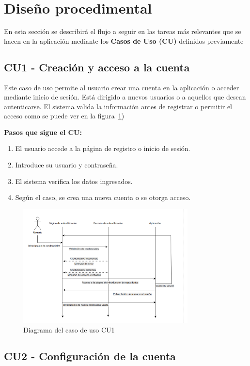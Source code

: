 \section{Diseño procedimental}
En esta sección se describirá el flujo a seguir en las tareas más relevantes que se hacen en la aplicación mediante los \textbf{Casos de Uso (CU)} definidos previamente

\subsection*{CU1 - Creación y acceso a la cuenta}

Este caso de uso permite al usuario crear una cuenta en la aplicación o acceder mediante inicio de sesión. Está dirigido a nuevos usuarios o a aquellos que desean autenticarse. El sistema valida la información antes de registrar o permitir el acceso como se puede ver en la figura~\ref{fig:DiagramaCU1})

\textbf{Pasos que sigue el CU:}
\begin{enumerate}
  \item El usuario accede a la página de registro o inicio de sesión.
  \item Introduce su usuario y contraseña.
  \item El sistema verifica los datos ingresados.
  \item Según el caso, se crea una nueva cuenta o se otorga acceso.
\end{enumerate}

\begin{figure}[H]
\centering
\includegraphics[width=0.8\textwidth]{img/DiagramaCU1.png}
\caption{Diagrama del caso de uso CU1}
\label{fig:DiagramaCU1}
\end{figure}

\subsection*{CU2 - Configuración de la cuenta}

